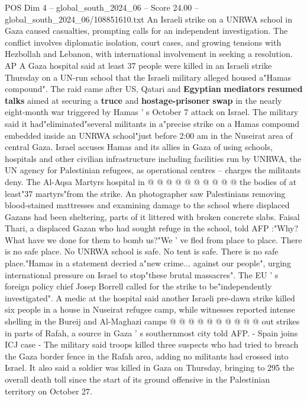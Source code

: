 \begin{textsample}{POS Dim 4 – global\_south\_2024\_06 – Score 24.00 – global\_south\_2024\_06/108851610.txt}  \label{ex:f4_pos_087}
An Israeli strike on a UNRWA school in Gaza caused casualties, prompting calls for an independent investigation.
The conflict involves diplomatic isolation, court cases, and growing tensions with Hezbollah and Lebanon, with international involvement in seeking a resolution.
AP A Gaza hospital said at least 37 people were killed in an Israeli strike Thursday on a UN-run school that the Israeli military alleged housed a"Hamas compound".
The raid came after US, Qatari and \textbf{Egyptian} \textbf{mediators} \textbf{resumed} \textbf{talks} aimed at securing a \textbf{truce} and \textbf{hostage-prisoner} \textbf{swap} in the nearly eight-month war triggered by Hamas ' s October 7 attack on Israel.
The military said it had"eliminated"several militants in a"precise strike on a Hamas compound embedded inside an UNRWA school"just before 2:00 am in the Nuseirat area of central Gaza.
Israel accuses Hamas and its allies in Gaza of using schools, hospitals and other civilian infrastructure including facilities run by UNRWA, the UN agency for Palestinian refugees, as operational centres -- charges the militants deny.
The Al-Aqsa Martyrs hospital in @ @ @ @ @ @ @ @ @ @ the bodies of at least"37 martyrs"from the strike.
An photographer saw Palestinians removing blood-stained mattresses and examining damage to the school where displaced Gazans had been sheltering, parts of it littered with broken concrete slabs.
Faisal Thari, a displaced Gazan who had sought refuge in the school, told AFP :"Why?
What have we done for them to bomb us?"We ' ve fled from place to place.
There is no safe place.
No UNRWA school is safe.
No tent is safe.
There is no safe place."Hamas in a statement decried a"new crime... against our people", urging international pressure on Israel to stop"these brutal massacres".
The EU ' s foreign policy chief Josep Borrell called for the strike to be"independently investigated".
A medic at the hospital said another Israeli pre-dawn strike killed six people in a house in Nuseirat refugee camp, while witnesses reported intense shelling in the Bureij and Al-Maghazi camps @ @ @ @ @ @ @ @ @ @ out strikes in parts of Rafah, a source in Gaza ' s southernmost city told AFP. - Spain joins ICJ case - The military said troops killed three suspects who had tried to breach the Gaza border fence in the Rafah area, adding no militants had crossed into Israel.
It also said a soldier was killed in Gaza on Thursday, bringing to 295 the overall death toll since the start of its ground offensive in the Palestinian territory on October 27.

\end{textsample}
